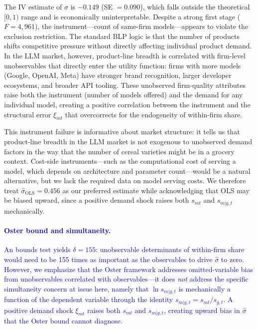 \documentclass[11pt, a4paper]{article}
\begin{document}
The IV estimate of $\sigma$ is $-0.149$ (SE $= 0.090$), which falls outside the theoretical $[0, 1)$ range and is economically uninterpretable. Despite a strong first stage ($F = 4{,}961$), the instrument---count of same-firm models---appears to violate the exclusion restriction. The standard BLP logic is that the number of products shifts competitive pressure without directly affecting individual product demand. In the LLM market, however, product-line breadth is correlated with firm-level unobservables that directly enter the utility function: firms with more models (Google, OpenAI, Meta) have stronger brand recognition, larger developer ecosystems, and broader API tooling. These unobserved firm-quality attributes raise both the instrument (number of models offered) and the demand for any individual model, creating a positive correlation between the instrument and the structural error $\xi_{mt}$ that overcorrects for the endogeneity of within-firm share.

This instrument failure is informative about market structure: it tells us that product-line breadth in the LLM market is not exogenous to unobserved demand factors in the way that the number of cereal varieties might be in a grocery context. Cost-side instruments---such as the computational cost of serving a model, which depends on architecture and parameter count---would be a natural alternative, but we lack the required data on model serving costs. We therefore treat $\hat{\sigma}_{\text{OLS}} = 0.456$ as our preferred estimate while acknowledging that OLS may be biased upward, since a positive demand shock raises both $s_{mt}$ and $s_{m|g,t}$ mechanically.

\textcolor{blue}{\paragraph{Oster bound and simultaneity.} An \citet{oster2019unobservable} bounds test yields $\delta = 155$: unobservable determinants of within-firm share would need to be 155 times as important as the observables to drive $\hat{\sigma}$ to zero. However, we emphasize that the Oster framework addresses omitted-variable bias from unobservables correlated with observables---it does \emph{not} address the specific simultaneity concern at issue here, namely that $\ln s_{m|g,t}$ is mechanically a function of the dependent variable through the identity $s_{m|g,t} = s_{mt}/s_{g,t}$. A positive demand shock $\xi_{mt}$ raises both $s_{mt}$ and $s_{m|g,t}$, creating upward bias in $\hat{\sigma}$ that the Oster bound cannot diagnose.}
\end{document}
